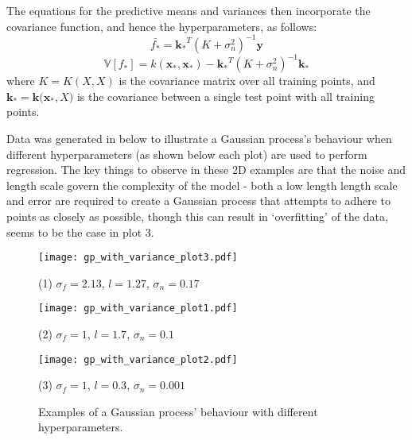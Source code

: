  The equations for the predictive means and variances then incorporate the covariance function, and hence the hyperparameters, as follows:
\begin{equation}
    \bar{f_*} = \mathbf{k_*}^T(K+\sigma_n^2)^{-1} \mathbf{y}
\end{equation}
\begin{equation}
    \mathbb{V}[f_*] = k(\mathbf{x_*},\mathbf{x_*}) - \mathbf{k_*}^T (K+\sigma^2_n)^{-1}\mathbf{k_*}
\end{equation}
where $K = K(X, X)$ is the covariance matrix over all training points, and $\mathbf{k_*} = \mathbf{k(x_*}, X)$ is the covariance between a single test point with all training points.

%  

Data was generated in  below to illustrate a Gaussian process's behaviour when different hyperparameters (as shown below each plot) are used to perform regression. The key things to observe in these 2D examples are that the noise and length scale govern the complexity of the model - both a low length length scale and error are required to create a Gaussian process that attempts to adhere to points as closely as possible, though this can result in `overfitting' of the data, seems to be the case in plot 3.

\begin{figure}
    \centering
    \begin{minipage}{0.53\linewidth}
        \texttt{[image: gp\_with\_variance\_plot3.pdf]}
        \caption*{(1) $\sigma_f = 2.13$, $l = 1.27$, $\sigma_n = 0.17$}
    \end{minipage}
    \hfill
    \begin{minipage}{0.47\linewidth}
        \texttt{[image: gp\_with\_variance\_plot1.pdf]}
        \caption*{(2) $\sigma_f = 1$, $l = 1.7$, $\sigma_n = 0.1$}
    \end{minipage}
    \begin{minipage}{0.47\linewidth}
        \texttt{[image: gp\_with\_variance\_plot2.pdf]}
        \caption*{(3) $\sigma_f = 1$, $l = 0.3$, $\sigma_n = 0.001$}
    \end{minipage}
    \label{fig:gptoyplots}
    \caption{Examples of a Gaussian process' behaviour with different hyperparameters.}
    \label{fig:gphp_ex}
\end{figure}


